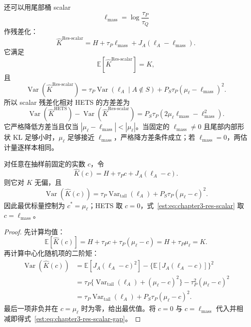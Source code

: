 \documentclass[lang=cn,scheme=chinese,openany]{../book/elegantbook}
\newcommand{\E}{\mathbb E}
\newcommand{\Var}{\operatorname{Var}}
\newcommand{\tail}{\mathrm{tail}}
\begin{document}
还可以用尾部桶 scalar
\begin{equation*}
 \ell_{\mathrm{mass}}=\log\frac{\tau_P}{\tau_Q}
\end{equation*}
作残差化：
\begin{equation}
 \widehat K^{\mathrm{Res\text{-}scalar}}
 =H+\tau_P\ell_{\mathrm{mass}}+J_A(\ell_A-\ell_{\mathrm{mass}}).
 \label{est:eq:chapter3-res-scalar}
\end{equation}
它满足
\begin{equation*}
 \E[\widehat K^{\mathrm{Res\text{-}scalar}}]=K,
\end{equation*}
且
\begin{equation}
 \Var(\widehat K^{\mathrm{Res\text{-}scalar}})
 =\tau_P\Var(\ell_A\mid A\notin S)+P_S\tau_P(\mu_\ell-\ell_{\mathrm{mass}})^2.
 \label{est:eq:chapter3-res-scalar-var}
\end{equation}
所以 scalar 残差化相对 HETS 的方差差为
\begin{equation}
 \Var(\widehat K^{\mathrm{HETS}})-\Var(\widehat K^{\mathrm{Res\text{-}scalar}})
 =P_S\tau_P(2\mu_\ell\ell_{\mathrm{mass}}-\ell_{\mathrm{mass}}^2).
 \label{est:eq:chapter3-res-scalar-gap}
\end{equation}
它严格降低方差当且仅当 $|\mu_\ell-\ell_{\mathrm{mass}}|<|\mu_\ell|$。当固定的 $\ell_{\mathrm{mass}}\ne0$ 且尾部内部形状 KL 足够小时，$\mu_\ell$ 足够接近 $\ell_{\mathrm{mass}}$，严格降方差条件成立；若 $\ell_{\mathrm{mass}}=0$，两估计量逐样本相同。

\begin{proposition}[标量尾部控制族]
对任意在抽样前固定的实数 $c$，令
\begin{equation*}
 \widehat K(c)=H+\tau_Pc+J_A(\ell_A-c).
\end{equation*}
则它对 $K$ 无偏，且
\begin{equation*}
 \Var(\widehat K(c))
 =\tau_P\Var_{\tail}(\ell_A)+P_S\tau_P(\mu_\ell-c)^2.
\end{equation*}
因此最优标量控制为 $c^*=\mu_\ell$；HETS 取 $c=0$，式~\eqref{est:eq:chapter3-res-scalar} 取 $c=\ell_{\mathrm{mass}}$。
\end{proposition}

\begin{proof}
先计算均值：
\begin{equation*}
 \E[\widehat K(c)]=H+\tau_Pc+\tau_P(\mu_\ell-c)=H+\tau_P\mu_\ell=K.
\end{equation*}
再计算中心化随机项的二阶矩：
\begin{align*}
 \Var(\widehat K(c))
 &=\E[J_A(\ell_A-c)^2]-\{\E[J_A(\ell_A-c)]\}^2\\
 &=\tau_P\{\Var_{\tail}(\ell_A)+(\mu_\ell-c)^2\}
   -\tau_P^2(\mu_\ell-c)^2\\
 &=\tau_P\Var_{\tail}(\ell_A)+P_S\tau_P(\mu_\ell-c)^2.
\end{align*}
最后一项非负并在 $c=\mu_\ell$ 时为零，给出最优值。将 $c=0$ 与 $c=\ell_{\mathrm{mass}}$ 代入并相减即得式~\eqref{est:eq:chapter3-res-scalar-gap}。
\end{proof}
\end{document}
